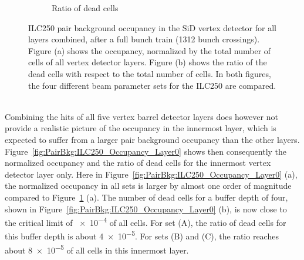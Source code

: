 \begin{figure}[h]
\begin{subfigure}[b]{0.49\textwidth}
   \caption{Ratio of dead cells}
   \end{subfigure}
   \caption[Pair background occupancy in the SiD vertex detector for the ILC250]{ILC250 pair background occupancy in the SiD vertex detector for all layers combined, after a full bunch train (1312 bunch crossings).
   Figure (a) shows the occupancy, normalized by the total number of cells of all vertex detector layers.
   Figure (b) shows the ratio of the dead cells with respect to the total number of cells.
   In both figures, the four different beam parameter sets for the ILC250 are compared.
   }
   \label{fig:PairBkg:ILC250_Occupancy}
 \end{figure}
\\Combining the hits of all five vertex barrel detector layers does however not provide a realistic picture of the occupancy in the innermost layer, which is expected to suffer from a larger pair background occupancy than the other layers.
Figure~\ref{fig:PairBkg:ILC250_Occupancy_Layer0} shows then consequently the normalized occupancy and the ratio of dead cells for the innermost vertex detector layer only.
Here in Figure~\ref{fig:PairBkg:ILC250_Occupancy_Layer0} (a), the normalized occupancy in all sets is larger by almost one order of magnitude compared to Figure~\ref{fig:PairBkg:ILC250_Occupancy} (a).
The number of dead cells for a buffer depth of four, shown in Figure~\ref{fig:PairBkg:ILC250_Occupancy_Layer0} (b), is now close to the critical limit of \num{e-4} of all cells.
For set (A), the ratio of dead cells for this buffer depth is about \num{4e-5}.
For sets (B) and (C), the ratio reaches about \num{8e-5} of all cells in this innermost layer.
